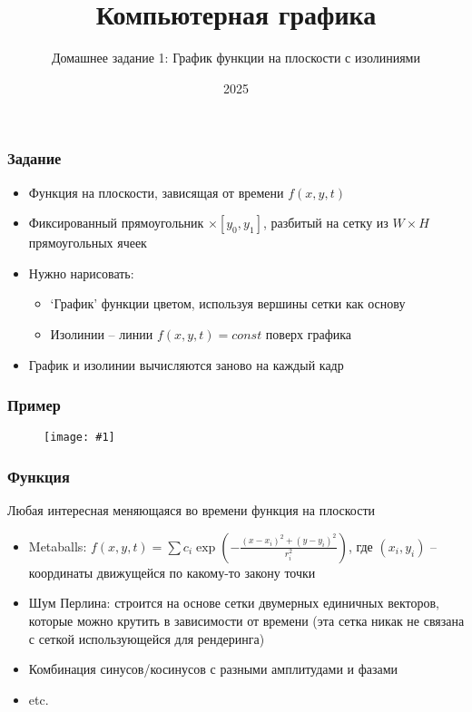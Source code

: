 \documentclass[10pt]{beamer}
\title{Компьютерная графика}
\subtitle{Домашнее задание 1: График функции на плоскости с изолиниями}
\date{2025}
\newcommand{\slideimage}[1]{
  \begin{figure}
    \begin{adjustbox}{width=\textwidth, totalheight=\textheight-2\baselineskip-2\baselineskip,keepaspectratio}
      \texttt{[image: \#1]}
    \end{adjustbox}
  \end{figure}
}
\begin{document}
\frame{\titlepage}

\begin{frame}[fragile]
\frametitle{Задание}
\begin{itemize}
\item Функция на плоскости, зависящая от времени \begin{math}f(x, y, t)\end{math}
\pause
\item Фиксированный прямоугольник \begin{math}[x_0, x_1] \times [y_0, y_1]\end{math}, разбитый на сетку из \begin{math}W\times H\end{math} прямоугольных ячеек
\pause
\item Нужно нарисовать:
\begin{itemize}
\item `График' функции цветом, используя вершины сетки как основу
\pause
\item Изолинии -- линии \begin{math}f(x,y,t) = const\end{math} поверх графика
\end{itemize}
\pause
\item График и изолинии вычисляются заново на каждый кадр
\end{itemize}
\end{frame}

\begin{frame}[fragile]
\frametitle{Пример}
\slideimage{example-plot.png}
\end{frame}

\begin{frame}[fragile]
\frametitle{Функция}
Любая интересная меняющаяся во времени функция на плоскости
\begin{itemize}
\item Metaballs: \begin{math}f(x,y,t) = \sum c_i\exp\left(-\frac{(x-x_i)^2+(y-y_i)^2}{r_i^2}\right)\end{math}, где \begin{math}(x_i, y_i)\end{math} -- координаты движущейся по какому-то закону точки
\pause
\item Шум Перлина: строится на основе сетки двумерных единичных векторов, которые можно крутить в зависимости от времени (эта сетка никак не связана с сеткой использующейся для рендеринга)
\pause
\item Комбинация синусов/косинусов с разными амплитудами и фазами
\pause
\item etc.
\end{itemize}
\end{frame}
\end{document}

